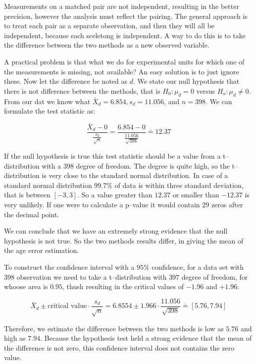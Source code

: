 Measurements on a matched pair are not independent, resulting in the better
precision, however the analysis must reflect the pairing. The general approach
is to treat each pair as a separate observation, and then they will all be
independent, because each sceletong is independent. A way to do this is to
take the difference between the two methods as a new observed variable.

A practical problem is that what we do for experimental units for which one of
the measurements is missing, not available? An easy solution is to just ignore
these. Now let the difference be noted as $d$. We state our null hypothesis that
there is not difference between the methods, that is $H_0: \mu_d=0$ versus
$H_a: \mu_d \neq 0$. From our dat we know what $\bar{X}_d=6.854, s_d = 11.056$,
and $n=398$. We can formulate the test statistic as:

\[ \frac{\bar{X}_d - 0}{\frac{s_d}{\sqrt{n}}} = \frac{6.854 -
0}{\frac{11.056}{\sqrt{398}}} \doteq 12.37 
\]

If the null hypothesis is true this test statistic should be a value from a
t--distribution with a $398$ degree of freedom. The degree is quite high, so the
t--distribution is very close to the standard normal distribution. In case of a
standard normal distribution $99.7\%$ of data is within three standard
deviation, that is between $[-3,3]$. So a value greater than $12.37$ or smaller
than $-12.37$ is very unlikely. If one were to calculate a p--value it would
contain $29$ zeros after the decimal point.

We can conclude that we have an extremely strong evidence that the null
hypothesis is not true. So the two methods results differ, in giving the mean of
the age error estimation.

To construct the confidence interval with a $95\%$ confidence, for a data set
with $398$ observation we need to take a t--distribution with $397$ degree of
freedom, for whoose area is $0.95$, thush resulting in the critical values of
$-1.96$ and $+1.96$: 

\[ \bar{X}_d \pm \mbox{critical value} \cdot 
\frac{s_d}{\sqrt{n}} = 6.8554 \pm 1.966 \cdot \frac{11.056}{\sqrt{398}} \doteq
[5.76, 7.94 ] \]

Therefore, we estimate the difference between the two methods is low as $5.76$
and high as $7.94$. Because the hypothesis test held a strong evidence that the
mean of the difference is not zero, this confidence interval does not contains
the zero value.

